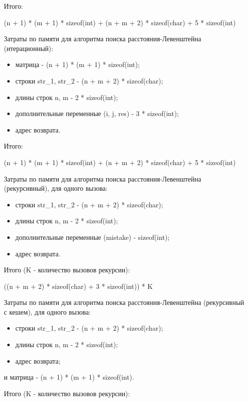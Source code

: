 Итого:

(n + 1) * (m + 1) * sizeof(int) + (n + m + 2) * sizeof(char) + 5 * sizeof(int)\newline
    
Затраты по памяти для алгоритма поиска расстояния-Левенштейна (итерационный):
\begin{itemize}
    \item матрица - (n + 1) * (m + 1) * sizeof(int);
    \item строки str\_1, str\_2 - (n + m + 2) * sizeof(char);
    \item длины строк n, m - 2 * sizeof(int);
    \item дополнительные переменные (i, j, res) - 3 * sizeof(int);
    \item адрес возврата.
\end{itemize}

Итого:

(n + 1) * (m + 1) * sizeof(int) + (n + m + 2) * sizeof(char) + 5 * sizeof(int)\newline

Затраты по памяти для алгоритма поиска расстояния-Левенштейна (рекурсивный), для одного вызова:
\begin{itemize}
    \item строки str\_1, str\_2 - (n + m + 2) * sizeof(char);
    \item длины строк n, m - 2 * sizeof(int);
    \item дополнительные переменные (mistake) - sizeof(int);
    \item адрес возврата.
\end{itemize}

Итого (K - количество вызовов рекурсии):

((n + m + 2) * sizeof(char) + 3 * sizeof(int)) * K\newline

Затраты по памяти для алгоритма поиска расстояния-Левенштейна (рекурсивный с кешем), для одного вызова:
\begin{itemize}
    \item строки str\_1, str\_2 - (n + m + 2) * sizeof(char);
    \item длины строк n, m - 2 * sizeof(int);
    \item адрес возврата;
\end{itemize}
и матрица - (n + 1) * (m + 1) * sizeof(int).\newline

Итого (K - количество вызовов рекурсии):

